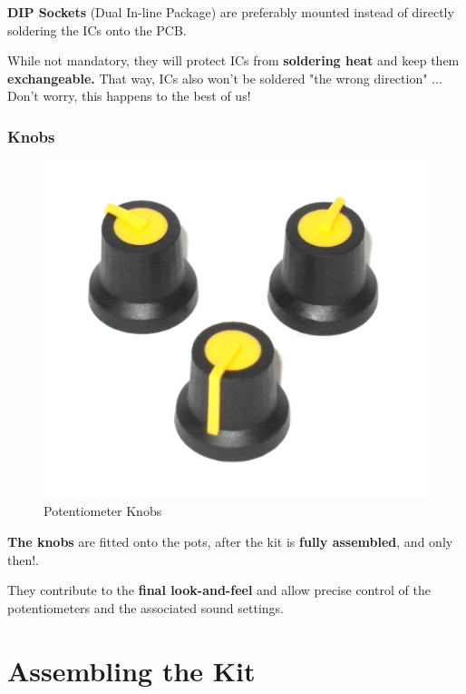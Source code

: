 \documentclass{scrartcl}
\begin{document}
\textbf{DIP Sockets} (Dual In-line Package) are preferably mounted instead of directly soldering the ICs onto the PCB.

While not mandatory, they will protect ICs from \textbf{soldering heat} and keep them \textbf{exchangeable.}
That way, ICs also won't be soldered "the wrong direction" ... Don't worry, this happens to the best of us!

\subsubsection{Knobs}

\begin{figure}[!ht]
    \begin{center}
        \includegraphics[scale=0.20]{assets/zekit-knobs.jpg}
        \caption{Potentiometer Knobs}
    \end{center}
\end{figure}

\textbf{The knobs} are fitted onto the pots, after the kit is \textbf{fully assembled}, and only then!.

They contribute to the \textbf{final look-and-feel} and allow precise control of the potentiometers and the associated sound settings.

\pagebreak

\section{Assembling the Kit}
\end{document}
